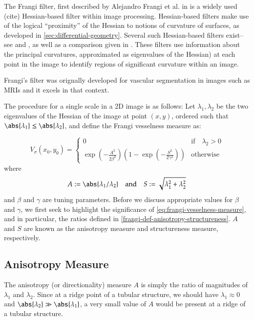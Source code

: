     The Frangi filter, first described by Alejandro Frangi et al. in \cite{frangi-paper} is a widely used (cite) Hessian-based filter
    within image processing. Hessian-based filters make use of the
    logical ``proximity'' of the Hessian to notions of curvature of surfaces,
    as developed in \cref{sec:differential-geometry}. 
    Several such Hessian-based filters exist--see \cite{sato-filter} and \cite{lorenz-filter}, as well as a comparison given in \cite{olabarriaga-hessian-comparison}. These filters use information about the principal curvatures, approximated as eigenvalues of the Hessian) at each point in the image
    to identify regions of significant curvature within an image.
 
    
    Frangi's filter was orignally developed for vascular segmentation in images such as MRIs and it excels in that context.
    
    The procedure for a single scale in a 2D image is as follows:
    Let $\lambda_1, \lambda_2$ be the two eigenvalues of the Hessian of the image at point $(x, y)$,
    ordered such that $\abs{\lambda_1} \leq \abs{\lambda_2}$, and define the Frangi vesselness measure %
    as:
    
    \begin{equation} \label{eq:frangi-vesselness-measure}
    V_\sigma(x_0,y_0) = \begin{cases}
    0 & \text{if} \quad \lambda_2 > 0 \\
    \exp\left(-\frac{A^2}{2\beta^2}\right)
    \left(1 - \exp(-\frac{S^2}{2\gamma^2})\right) & \text{otherwise}
    \end{cases} \end{equation}
    where
    \begin{equation} \label{frangi-def-anisotropy-structureness}
    A := \abs{\lambda_1 / \lambda_2}
    \quad \textrm{and} \quad 
    S := \sqrt{\lambda_1^2 + \lambda_2^2}
    \end{equation}
    and $\beta$ and $\gamma$ are tuning parameters. Before we discuss appropriate values for $\beta$ and $\gamma$, we first seek to highlight the significance of \cref{eq:frangi-vesselness-measure}, and in particular, the ratios defined in
    \cref{frangi-def-anisotropy-structureness}. $A$ and $S$ are known as the anisotropy measure and structureness measure, respectively. 
    
    \subsection{Anisotropy Measure} \label{sec:frangi.anisotropy}
    The anisotropy (or directionality) measure $A$ is simply the ratio of magnitudes of $\lambda_1$ and $\lambda_2$. Since at a ridge point of a tubular structure, we should have $\lambda_1 \approx 0$ and $\abs{\lambda_2} \gg \abs{\lambda_1}$,
    a very small value of $A$ would be present at a ridge of a tubular structure.
    
